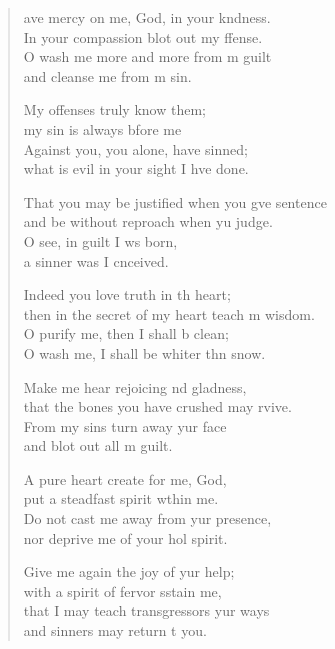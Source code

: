 \begin{verse}
  \begin{patverse}
    ave mercy on me, God, in your k\pointup{\i}ndness.\Med\\
In your compassion blot out my ffense.\\
O wash me more and more from m guilt\Med\\
and cleanse me from m sin.

My offenses truly  know them;\Med\\
my sin is always bfore me\\
Against you, you alone, have  sinned;\Med\\
what is evil in your sight I hve done.

That you may be justified when you g\pointup{\i}ve sentence\Med\\
and be without reproach when yu judge.\\
O see, in guilt I ws born,\Med\\
a sinner was I cnceived.

Indeed you love truth in th heart;\Med\\
then in the secret of my heart teach m wisdom.\\
O purify me, then I shall b clean;\Med\\
O wash me, I shall be whiter thn snow.

Make me hear rejoicing nd gladness,\Med\\
that the bones you have crushed may rvive.\\
From my sins turn away yur face\Med\\
and blot out all m guilt.

A pure heart create for me,  God,\Med\\
put a steadfast spirit w\pointup{\i}thin me.\\
Do not cast me away from yur presence,\Med\\
nor deprive me of your hol spirit.

Give me again the joy of yur help;\Med\\
with a spirit of fervor sstain me,\\
that I may teach transgressors yur ways\Med\\
and sinners may return t you.


\end{patverse}
\end{verse}
